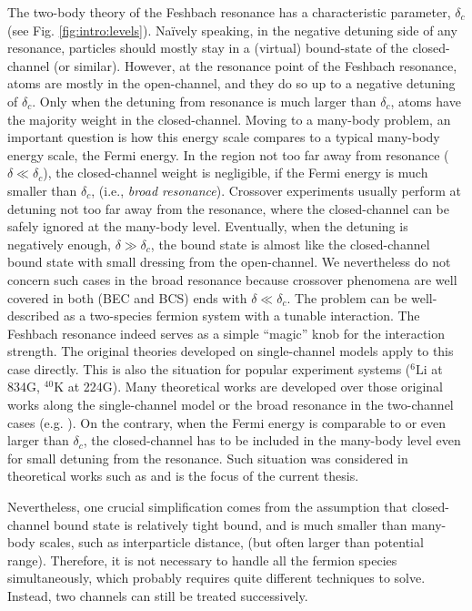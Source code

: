   The two-body theory of the Feshbach resonance has a characteristic  parameter, $\delta_c$ (see Fig. \ref{fig:intro:levels}).  Na\"{i}vely speaking, in the negative detuning side of any resonance, particles should mostly stay  in a (virtual) bound-state of the closed-channel (or similar).  However, at the resonance point  of the Feshbach resonance, atoms are mostly in the open-channel, and they do so up to a negative detuning of $\delta_c$. Only when the detuning from resonance is much larger than $\delta_c$, atoms have the majority weight in the closed-channel.    Moving to a many-body problem, an important question is how this energy scale compares to a typical many-body energy scale, the Fermi energy. In the region not too far away from resonance ($\delta\ll\delta_{c}$), the closed-channel weight is negligible, if the Fermi energy is much smaller than $\delta_c$, (i.e., \emph{broad resonance}).  Crossover experiments usually perform at detuning not too far away from the resonance, where the closed-channel can be safely ignored at the many-body level. Eventually, when the detuning is negatively enough, $\delta\gg\delta_{c}$, the bound state is almost like the closed-channel bound state with small dressing from the open-channel.  We nevertheless do not concern such cases in the broad resonance because crossover phenomena are well covered in both (BEC and BCS) ends with $\delta\ll\delta_{c}$. The problem can be well-described as a two-species fermion system with a tunable interaction.  The Feshbach resonance indeed serves as a simple ``magic'' knob for the interaction strength.  The original  theories developed on  single-channel models  apply to this case directly.  This is also the situation for  popular experiment systems (${}^{6}\text{Li}$ at 834G, $^{40}\text{K}$ at 224G).   Many theoretical works are developed over those original works along the single-channel model or the broad resonance   in  the two-channel cases (e.g. \cite{Holland01,HoUniversal,Fuchs04}). On the contrary, when the Fermi energy is  comparable to or even larger than $\delta_c$, the closed-channel has to be included in the many-body level even for small detuning from the resonance. Such situation was considered in  theoretical works such as \cite{GurarieNarrow} and is the focus of the current thesis. 
  
  Nevertheless, one crucial simplification comes from  the assumption that closed-channel bound state is relatively tight bound, and is much smaller than  many-body scales, such as interparticle distance, (but often larger than potential range).  Therefore, it is not necessary to handle all the  fermion species simultaneously, which probably requires quite different techniques to solve. Instead, two channels can still be treated successively. 


